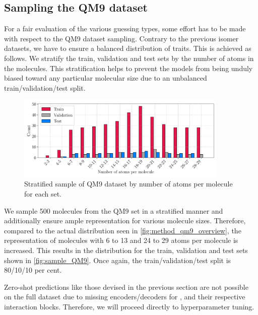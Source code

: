 \subsection{Sampling the QM9 dataset}
\label{sec:qm9_full_isomers_sampling}
For a fair evaluation of the various guessing types, some effort has to be made with respect to the QM9 dataset sampling. Contrary to the previous isomer datasets, we have to ensure a balanced distribution of traits. This is achieved as follows. We stratify the train, validation and test sets by the number of atoms in the molecules. This stratification helps to prevent the models from being unduly biased toward any particular molecular size due to an unbalanced train/validation/test split.
\begin{figure}[H]
    \centering
    \includegraphics[width=0.9\textwidth]{../fig/application/strat_sample.pdf}
    \caption[Stratified sample of QM9 dataset]{Stratified sample of QM9 dataset by number of atoms per molecule for each set.}
    \label{fig:sample_QM9}
\end{figure}
We sample 500 molecules from the QM9 set in a stratified manner and additionally ensure ample representation for various molecule sizes. Therefore, compared to the actual distribution seen in \autoref{fig:method_qm9_overview}, the representation of molecules with 6 to 13 and 24 to 29 atoms per molecule is increased. This results in the distribution for the train, validation and test sets shown in \autoref{fig:sample_QM9}. Once again, the train/validation/test split is 80/10/10 per cent. %

Zero-shot predictions like those devised in the previous section are not possible on the full dataset due to missing encoders/decoders for ,  and their respective interaction blocks. Therefore, we will proceed directly to hyperparameter tuning. 
